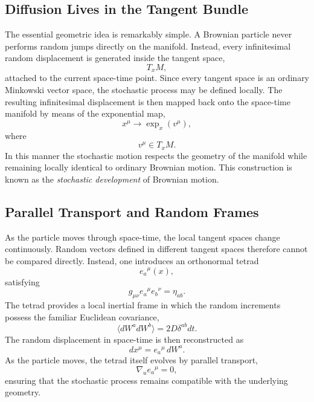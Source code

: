 \subsection{Diffusion Lives in the Tangent Bundle}
The essential geometric idea is remarkably simple.
A Brownian particle never performs random jumps directly on the
manifold.
Instead,
every infinitesimal random displacement is generated inside the tangent
space,
\[T_xM,\]
attached to the current space-time point.
Since every tangent space is an ordinary Minkowski vector space, the
stochastic process may be defined locally.
The resulting infinitesimal displacement is then mapped back onto the
space-time manifold by means of the exponential map,
\begin{equation}
x^\mu\longrightarrow\exp_x(v^\mu),
\end{equation}
where
\[v^\mu\in T_xM.\]
In this manner the stochastic motion respects the geometry of the
manifold while remaining locally identical to ordinary Brownian motion.
This construction is known as the
\emph{stochastic development} of Brownian motion.
\subsection{Parallel Transport and Random Frames}
As the particle moves through space-time, the local tangent spaces
change continuously.
Random vectors defined in different tangent spaces therefore cannot be
compared directly.
Instead,
one introduces an orthonormal tetrad
\[e_a{}^\mu(x),\]
satisfying
\[g_{\mu\nu}e_a{}^\mu e_b{}^\nu=\eta_{ab}.\]
The tetrad provides a local inertial frame in which the random
increments possess the familiar Euclidean covariance,
\[\langle dW^a dW^b \rangle=2D\delta^{ab}dt.\]
The random displacement in space-time is then reconstructed as
\[dx^\mu=e_a{}^\mu\,dW^a.\]
As the particle moves,
the tetrad itself evolves by parallel transport,
\[\nabla_u e_a{}^\mu=0,\]
ensuring that the stochastic process remains compatible with the
underlying geometry.
